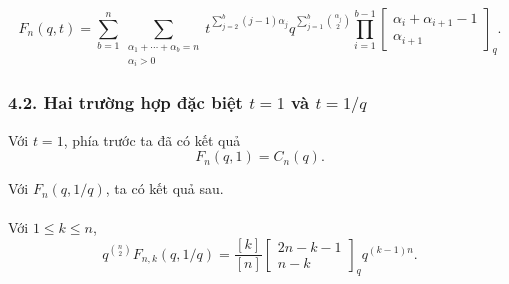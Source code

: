 \documentclass[11pt]{article}
\begin{document}
\paragraph{}
\[
  F_n(q,t)=
  \sum_{b=1}^{n}
  \sum_{\substack{\alpha_1+\cdots+\alpha_b=n\\ \alpha_i>0}}
  t^{\sum_{j=2}^{b}(j-1)\alpha_j}
  q^{\sum_{j=1}^{b}\binom{\alpha_j}{2}}
  \prod_{i=1}^{b-1}
  \left[\begin{matrix}\alpha_i+\alpha_{i+1}-1\\ \alpha_{i+1}\end{matrix}\right]_q.
\]

\subsubsection*{4.2. Hai trường hợp đặc biệt \(t=1\) và \(t=1/q\)}

Với \(t=1\), phía trước ta đã có kết quả
\[
  F_n(q,1)=C_n(q).
\]

Với \(F_n(q,1/q)\), ta có kết quả sau.

\paragraph{}
Với \(1\le k\le n\),
\[
  q^{\binom{n}{2}}F_{n,k}(q,1/q)
  =
  \frac{[k]}{[n]}
  \left[\begin{matrix}2n-k-1\\ n-k\end{matrix}\right]_q
  q^{(k-1)n}.
\]
\end{document}
